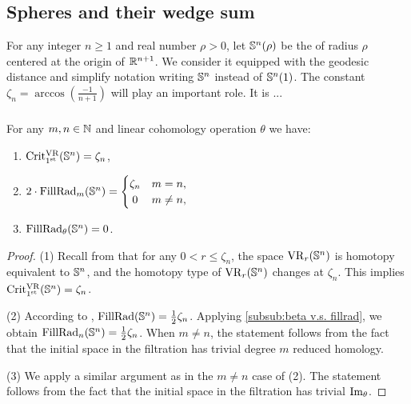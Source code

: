 
\subsection{Spheres and their wedge sum }\label{ss:Sn}\label{sub:Sn and wedge sum}

For any integer $n \geq 1$ and real number $\rho > 0$, let $\mathbb{S}^n(\rho)$ be the  of radius $\rho$ centered at the origin of $\mathbb{R}^{n+1}$.
We consider it equipped with the geodesic distance and simplify notation writing \(\mathbb{S}^n\) instead of \(\mathbb{S}^n(1)\).
The constant \(\zeta_n = \arccos(\tfrac{-1}{n+1})\) will play an important role.
It is ... 

\subsubsection{}
\label{subsub:critical values of Sn}
\medskip\proposition
For any $m,n \in \mathbb{N}$ and linear cohomology operation $\theta$ we have:
\begin{enumerate}
	\item \(\operatorname{Crit^{\mathrm{VR}}_{1^{\mathrm{st}}}}(\mathbb{S}^n) = \zeta_n\),
	\item \(2\cdot\firstdeath{m}{\bS^n} =
	\begin{cases}
		\zeta_n & m = n, \\
		\hfil 0 & m \neq n,
	\end{cases}\)
	\item \(\operatorname{FillRad}_{\theta}(\mathbb{S}^n) = 0\).
\end{enumerate}

\begin{proof}
	(1) Recall from \cite[Thm.~7.1]{lim2020vietoris} that for any $0 < r \leq \zeta_n$, the space $\mathrm{VR}_r(\mathbb{S}^n)$ is homotopy equivalent to $\mathbb{S}^n$, and the homotopy type of $\mathrm{VR}_r(\mathbb{S}^n)$ changes at $\zeta_n$.
	This implies $\operatorname{Crit^{\mathrm{VR}}_{1^{\mathrm{st}}}}(\mathbb{S}^n)=\zeta_n$.

	(2) According to \cite{katz1983filling}, \(\mathrm{FillRad}(\mathbb{S}^n) = \frac{1}{2}\zeta_n\).
	Applying \cref{subsub:beta v.s. fillrad}, we obtain \(\operatorname{FillRad}_{n}(\mathbb{S}^n) = \frac{1}{2}\zeta_n\).
    When $m\neq n$, the statement follows from the fact that the initial space in the filtration has trivial degree $m$ reduced homology.

	(3) We apply a similar argument as in the $m\neq n$ case of (2). The statement follows from the fact that the initial space in the filtration has trivial $\operatorname{Im}_\theta$.
\end{proof}

